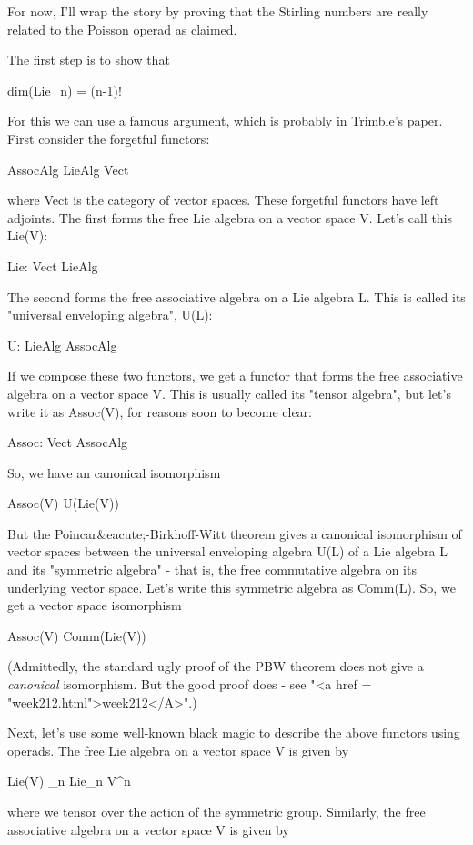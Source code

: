 For now, I'll wrap the story by proving that the Stirling numbers
are really related to the Poisson operad as claimed.

The first step is to show that

dim(Lie_{n}) = (n-1)!  

For this we can use a famous argument, which is probably in Trimble's
paper.  First consider the forgetful functors:

AssocAlg \to  LieAlg \to  Vect

where Vect is the category of vector spaces.  These forgetful functors
have left adjoints.  The first forms the free Lie algebra on a vector
space V.  Let's call this Lie(V):

Lie: Vect \to  LieAlg

The second forms the free associative algebra on a Lie algebra L.
This is called its "universal enveloping algebra", U(L):

U: LieAlg \to  AssocAlg

If we compose these two functors, we get a functor that forms the free
associative algebra on a vector space V.  This is usually called its
"tensor algebra", but let's write it as Assoc(V), for reasons
soon to become clear:

Assoc: Vect \to  AssocAlg

So, we have an canonical isomorphism

Assoc(V) \cong  U(Lie(V))

But the Poincar&eacute;-Birkhoff-Witt theorem gives a canonical
isomorphism of vector spaces between the universal enveloping algebra
U(L) of a Lie algebra L and its "symmetric algebra" - that
is, the free commutative algebra on its underlying vector space.
Let's write this symmetric algebra as Comm(L).  So, we get a vector
space isomorphism

Assoc(V) \cong  Comm(Lie(V))

(Admittedly, the standard ugly proof of the PBW theorem does not give
a \emph{canonical} isomorphism.  But the good proof does - see
"<a href = "week212.html">week212</A>".)

Next, let's use some well-known black magic to describe the above
functors using operads.  The free Lie algebra on a vector space V is
given by

Lie(V) \cong  \oplus _{n} Lie_{n} \otimes 
V^{\otimes n}

where we tensor over the action of the symmetric group.  Similarly,
the free associative algebra on a vector space V is given by

